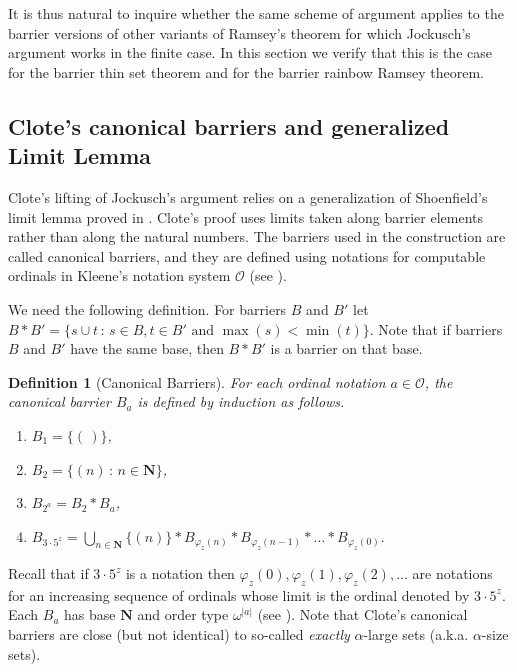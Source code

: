 \documentclass{amsart}
\theoremstyle{plain}
\theoremstyle{plain}
\newtheorem*{definition}{Definition}
\newcommand{\om}{\omega}
\newcommand\Nat{\mathbf{N}}
\newcommand\KO{\mathcal{O}}
\begin{document}
It is thus natural to inquire whether the same scheme of argument applies to the barrier versions of other variants of Ramsey's theorem for which Jockusch's argument works in the finite case. In this section we verify that this is the case for the barrier thin set theorem and for the barrier rainbow Ramsey theorem. 

\subsection{Clote's canonical barriers and generalized Limit Lemma}

Clote's lifting of Jockusch's argument relies on a generalization of Shoenfield's limit lemma proved in \cite{clote1986generalization}. 
Clote’s proof uses limits taken along barrier elements rather than along the natural numbers. The barriers used in the construction are called canonical barriers, and they are defined using notations for computable ordinals in Kleene’s notation system $\KO$ (see \cite{Rogers1987}).

We need the following definition. For barriers $B$ and $B'$ let $B * B' = \{ s \cup t \,:\, s \in B, t\in B' \mbox{ and }\max(s)<\min(t)\}$. Note that if barriers $B$ and $B'$ have the same base, then $B * B'$ is a barrier on that base.

\begin{definition}[Canonical Barriers]
For each ordinal notation $a \in \mathcal{O}$, the canonical barrier $B_a$ is defined by induction as follows.
\begin{enumerate}
    \item $B_1 = \{( \,)\}$, 
\item $B_2 = \{ (n) \,:\, n \in \Nat\}$, 
\item $B_{2^a} = B_2 * B_a$,
\item $B_{3\cdot 5^z} = \bigcup_{n\in\Nat} \{ (n)\} * B_{\varphi_z(n)}*B_{\varphi_z(n-1)}*\dots*B_{\varphi_z(0)}.$
\end{enumerate}
\end{definition}

Recall that if $3\cdot 5^z$ is a notation then $\varphi_z(0), \varphi_z(1), \varphi_z(2),\dots$ are notations for an increasing sequence of ordinals whose limit is the ordinal denoted by $3\cdot 5^z$. Each $B_a$ has base $\Nat$ and order type $\om^{|a|}$ (see \cite{Clote1984}). Note that Clote's canonical barriers are close (but not identical) to so-called {\em exactly} $\alpha$-large sets (a.k.a. $\alpha$-size sets). 
\end{document}
